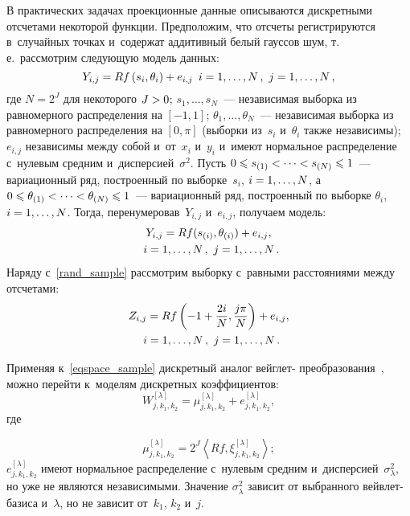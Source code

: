 \begin{multicols}{2}
В практических задачах проекционные данные описываются дискретными 
отсчетами некоторой функции. Предположим, что отсчеты регист\-ри\-ру\-ют\-ся 
в~случайных точках и~содержат аддитивный белый гауссов шум, т.\,е.\ 
рассмотрим следующую модель данных:
\begin{equation*}
Y_{i,j} = R f\left(s_i,\theta_i\right) + e_{i,j} \enskip i = 1, \ldots, 
N\,, \ j = 1, \ldots, N\,,
\end{equation*}
где $N=2^J$ для некоторого $J\hm>0$; $s_1,\ldots,s_N$~--- независимая 
выборка из равномерного распределения на $[-1,1]$; 
$\theta_1,\ldots,\theta_N$~--- независимая выборка из равномерного 
распределения на $[0,\pi]$ (выборки из~$s_i$ и~$\theta_i$ также 
независимы); $e_{i,j}$ независимы между собой и~от~$x_i$ и~$y_i$ 
и~имеют нормальное распределение с~нулевым средним 
и~дисперсией~$\sigma^2$.
Пусть $0\hm\leqslant s_{(1)}<\cdots< s_{(N)}\hm\leqslant 1$~--- 
вариационный ряд, построенный по выборке~$s_i$, $i\hm=1,\ldots,N$, 
а~$0\hm\leqslant \theta_{(1)}<\cdots< \theta_{(N)}\hm\leqslant 1$~--- 
вариационный ряд, построенный по выборке $\theta_i$, $i\hm=1,\ldots,N$. 
Тогда, перенумеровав~$Y_{i,j}$ и~$e_{i,j}$, получаем модель:
\begin{multline}
\label{rand_sample}
Y_{i,j} = R f(s_{(i)},\theta_{(i)}) + e_{i,j}, \\ 
\enskip i = 1, \ldots, N\,, \ j = 1, \ldots, N\,.
\end{multline}
Наряду с~\eqref{rand_sample} рассмотрим выборку с~равными расстояниями 
между отсчетами:
\begin{multline}
\label{eqspace_sample}
Z_{i,j} = R f\left(-1+\displaystyle\frac{\displaystyle 2i\mathstrut}{\displaystyle N\mathstrut},\displaystyle\frac{\displaystyle j\pi\mathstrut}{\displaystyle N\mathstrut}\right) + e_{i,j},\\
 \enskip i = 1, \ldots, N\,, \ j = 1, \ldots, N\,.
\end{multline}

Применяя к~\eqref{eqspace_sample} дискретный аналог вейглет-
преобразования~\cite{ESH14}, можно перейти к~моделям дискретных 
коэффициентов:
\begin{equation}
W_{j,k_1,k_2}^{[\lambda]} = \mu_{j,k_1,k_2}^{[\lambda]} + 
e_{j,k_1,k_2}^{[\lambda]},
\label{WVD_model}
\end{equation}
где 

\vspace*{-2pt}

\noindent
$$\mu_{j,k_1,k_2}^{[\lambda]} = 2^J\left\langle Rf, 
\xi_{j,k_1,k_2}^{[\lambda]}\right\rangle;
$$
$e^{[\lambda]}_{j,k_1,k_2}$ имеют 
нормальное распределение с~нулевым средним 
и~дисперсией~$\sigma^2_\lambda$, но уже не являются независимыми. 
Значение $\sigma^2_\lambda$ зависит от выбранного вейвлет-базиса 
и~$\lambda$, но не зависит от~$k_1$, $k_2$ и~$j$.


\end{multicols}
